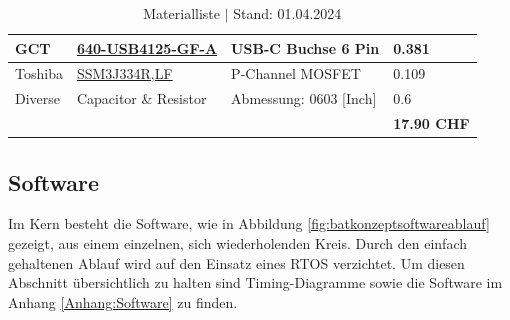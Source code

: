 \documentclass[12pt]{article}
\begin{document}
\begin{table}[!ht]
\begin{tabular}{|l|l|l|l|}
		GCT & \href{https://www.mouser.ch/ProductDetail/GCT/USB4125-GF-A?qs=KUoIvG\%2F9IlaIQ4zBJ6gLeA\%3D\%3D}{640-USB4125-GF-A} & USB-C Buchse 6 Pin & 0.381 \\ \hline
		Toshiba & \href{https://www.mouser.ch/ProductDetail/Toshiba/SSM3J334RLF?qs=PiFplXvYe5VBSYhr6TJz8A\%3D\%3D}{SSM3J334R,LF} & P-Channel MOSFET & 0.109 \\ \hline
		Diverse & Capacitor \& Resistor & Abmessung: 0603 [Inch] & 0.6 \\\hline
		~ & ~ & ~ & \textbf{17.90 CHF} \\ \hline
	\end{tabular}
	\caption{Materialliste $\vert$ Stand: 01.04.2024}
	\label{table:materialliste}
\end{table}
	\subsection{Software}
	Im Kern besteht die Software, wie in Abbildung \ref{fig:batkonzeptsoftwareablauf} gezeigt, aus einem einzelnen, sich wiederholenden Kreis. Durch den einfach gehaltenen Ablauf wird auf den Einsatz eines RTOS verzichtet. Um diesen Abschnitt übersichtlich zu halten sind Timing-Diagramme sowie die Software im Anhang \ref{Anhang:Software} zu finden.
\end{document}
